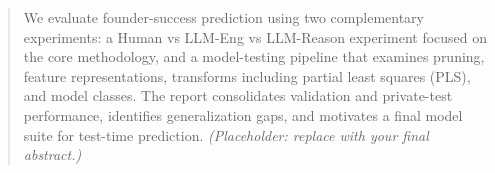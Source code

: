 \documentclass{article}
\theoremstyle{plain}
\theoremstyle{definition}
\theoremstyle{remark}
\begin{document}



\printAffiliationsAndNotice{}  %

\begin{abstract}
We evaluate founder-success prediction using two complementary experiments: a Human vs LLM-Eng vs LLM-Reason experiment focused on the core methodology, and a model-testing pipeline that examines pruning, feature representations, transforms including partial least squares (PLS), and model classes. The report consolidates validation and private-test performance, identifies generalization gaps, and motivates a final model suite for test-time prediction. \textit{(Placeholder: replace with your final abstract.)}
\end{abstract}
\end{document}
